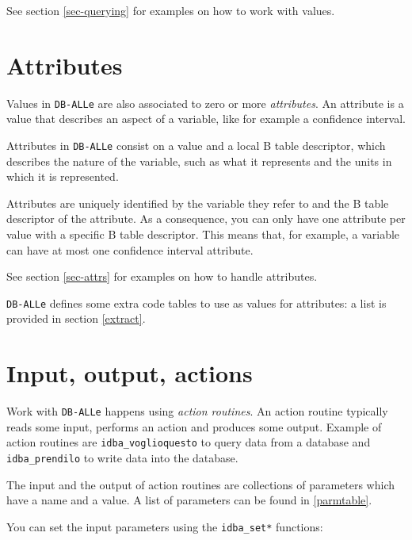 \documentclass[final,12pt,a4paper,twoside]{book}
\newcommand{\dballe}{{\tt DB-ALLe}}
\begin{document}
See section \ref{sec-querying} for examples on how to work with values.

\section {Attributes}

Values in \dballe{} are also associated to zero or more \emph{attributes}.  An
attribute is a value that describes an aspect of a variable, like for example a
confidence interval.

Attributes in \dballe{} consist on a value and a local B table descriptor,
which describes the nature of the variable, such as what it represents and the
units in which it is represented.

Attributes are uniquely identified by the variable they refer to and the B
table descriptor of the attribute.  As a consequence, you can only have one
attribute per value with a specific B table descriptor.  This means that, for
example, a variable can have at most one confidence interval attribute.

See section \ref{sec-attrs} for examples on how to handle attributes.

\dballe{} defines some extra code tables to use as values for attributes: a
list is provided in section \ref{extract}.

\section {Input, output, actions}
\label{basics-inout}

Work with \dballe{} happens using \emph{action routines}.  An action routine
typically reads some input, performs an action and produces some output.
Example of action routines are {\tt idba\_voglioquesto} to query data from a
database and {\tt idba\_prendilo} to write data into the database.

The input and the output of action routines are collections of parameters which
have a name and a value.  A list of parameters can be found in
\ref{parmtable}.

You can set the input parameters using the {\tt idba\_set*} functions:
\label{fun-idba_set}
\end{document}

